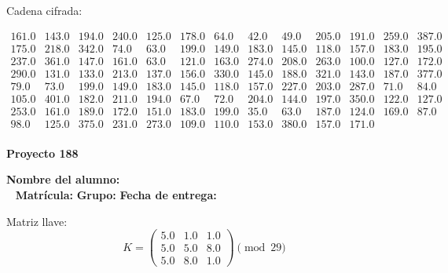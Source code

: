 \documentclass[12pt]{article}
\begin{document}
Cadena cifrada:
\begin{center}
$\begin{array}{lllllllllllll}
161.0 & 143.0 & 194.0 & 240.0 & 125.0 & 178.0 & 64.0 & 42.0 & 49.0 & 205.0 & 191.0 & 259.0 & 387.0\\
175.0 & 218.0 & 342.0 & 74.0 & 63.0 & 199.0 & 149.0 & 183.0 & 145.0 & 118.0 & 157.0 & 183.0 & 195.0\\
237.0 & 361.0 & 147.0 & 161.0 & 63.0 & 121.0 & 163.0 & 274.0 & 208.0 & 263.0 & 100.0 & 127.0 & 172.0\\
290.0 & 131.0 & 133.0 & 213.0 & 137.0 & 156.0 & 330.0 & 145.0 & 188.0 & 321.0 & 143.0 & 187.0 & 377.0\\
79.0 & 73.0 & 199.0 & 149.0 & 183.0 & 145.0 & 118.0 & 157.0 & 227.0 & 203.0 & 287.0 & 71.0 & 84.0\\
105.0 & 401.0 & 182.0 & 211.0 & 194.0 & 67.0 & 72.0 & 204.0 & 144.0 & 197.0 & 350.0 & 122.0 & 127.0\\
253.0 & 161.0 & 189.0 & 172.0 & 151.0 & 183.0 & 199.0 & 35.0 & 63.0 & 187.0 & 124.0 & 169.0 & 87.0\\
98.0 & 125.0 & 375.0 & 231.0 & 273.0 & 109.0 & 110.0 & 153.0 & 380.0 & 157.0 & 171.0\\
\end{array}$
\end{center}

\newpage


\textbf{Proyecto 188}

\textbf{Nombre del alumno:} \underline{\hspace{13cm}}\\\
\vspace{1cm}
\textbf{Matrícula:} \underline{\hspace{4cm}} \hspace{1cm}
\textbf{Grupo:} \underline{\hspace{2cm}}
\textbf{Fecha de entrega:} \underline{\hspace{2cm}}

\medskip

Matriz llave:
\[
K = \begin{pmatrix}
5.0 & 1.0 & 1.0\\
5.0 & 5.0 & 8.0\\
5.0 & 8.0 & 1.0
\end{pmatrix} \pmod{29}
\]
\end{document}
